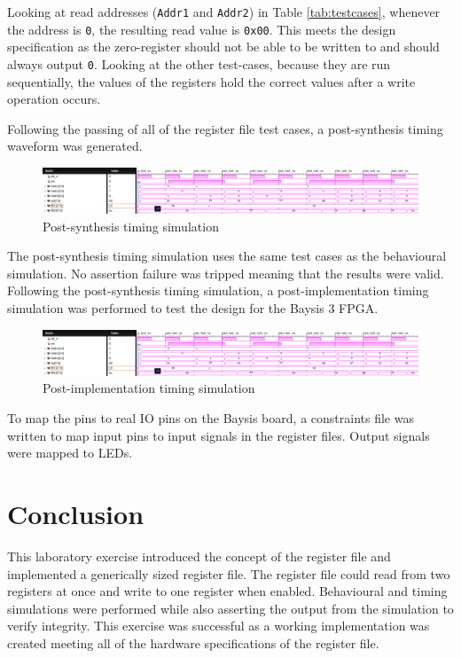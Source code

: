\documentclass[CMPE]{../KGCOEReport}
\def\code#1{\texttt{#1}}
\begin{document}
    Looking at read addresses (\code{Addr1} and \code{Addr2}) in
    Table \ref{tab:testcases}, whenever the address is \code{0}, the
    resulting read value is \code{0x00}.
    This meets the design specification as the zero-register should not
    be able to be written to and should always output \code{0}.
    Looking at the other test-cases, because they are run sequentially,
    the values of the registers hold the correct values after a write
    operation occurs.

    Following the passing of all of the register file test cases, a
    post-synthesis timing waveform was generated.

    \begin{figure}[h!]
        \centering
        \includegraphics[width=\textwidth]{img/synthesis-timing}
        \caption{Post-synthesis timing simulation}
        \label{fig:synth}
    \end{figure}

    The post-synthesis timing simulation uses the same test cases as the
    behavioural simulation.
    No assertion failure was tripped meaning that the results were valid.
    \\

    Following the post-synthesis timing simulation, a post-implementation
    timing simulation was performed to test the design for the Baysis 3
    FPGA.

    \begin{figure}[h!]
        \centering
        \includegraphics[width=\textwidth]{img/synthesis-timing}
        \caption{Post-implementation timing simulation}
        \label{fig:impl}
    \end{figure}

    To map the pins to real IO pins on the Baysis board, a constraints
    file was written to map input pins to input signals in the register
    files.
    Output signals were mapped to LEDs.

    \section*{Conclusion}
    This laboratory exercise introduced the concept of the register file
    and implemented a generically sized register file.
    The register file could read from two registers at once and write
    to one register when enabled.
    Behavioural and timing simulations were performed while also asserting
    the output from the simulation to verify integrity.
    This exercise was successful as a working implementation was created
    meeting all of the hardware specifications of the register file.
\end{document}
